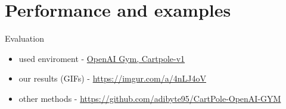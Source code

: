 \documentclass{beamer}
\begin{document}
\section{Performance and examples}
\begin{frame}{Evaluation}
    \begin{itemize}
        \item used enviroment - \href{https://gym.openai.com}{OpenAI Gym, Cartpole-v1}
        \item our results (GIFs) - \href{https://imgur.com/a/4nLJ4oV}{https://imgur.com/a/4nLJ4oV}
        \item other methods - \href{https://github.com/adibyte95/CartPole-OpenAI-GYM}{https://github.com/adibyte95/CartPole-OpenAI-GYM}
    \end{itemize}
    
\end{frame}
\end{document}
